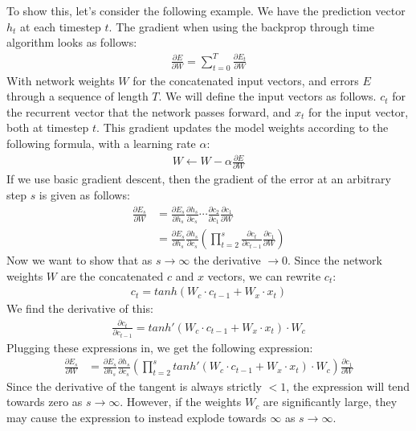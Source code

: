 To show this, let's consider the following example. We have the prediction vector $h_t$ at each timestep $t$. The gradient when using the backprop through time algorithm looks as follows:
\begin{align}
    \frac{\partial E}{\partial W} = \sum_{t=0}^{T} \frac{\partial E_t}{\partial W}
\end{align}
With network weights $W$ for the concatenated input vectors, and errors $E$ through a sequence of length $T$. We will define the input vectors as follows. $c_t$ for the recurrent vector that the network passes forward, and $x_t$ for the input vector, both at timestep $t$.
This gradient updates the model weights according to the following formula, with a learning rate $\alpha$:
\begin{align}
    W \leftarrow W - \alpha \frac{\partial E}{\partial W}
\end{align}
If we use basic gradient descent, then the gradient of the error at an arbitrary step $s$ is given as follows:
\begin{align}
    \frac{\partial E_s}{\partial W} &= \frac{\partial E_s}{\partial h_s}\frac{\partial h_s}{\partial c_s} \cdots \frac{\partial c_2}{\partial c_1} \frac{\partial c_1}{\partial W} \\
    &= \frac{\partial E_s}{\partial h_s}\frac{\partial h_s}{\partial c_s} \left(\prod_{t=2}^s\frac{\partial c_t}{\partial c_{t-1}} \frac{\partial c_1} {\partial W} \right)
\end{align}
Now we want to show that as $s \rightarrow \infty$ the derivative $\rightarrow 0$. Since the network weights $W$ are the concatenated $c$ and $x$ vectors, we can rewrite $c_t$:
\begin{align}
    c_t = tanh(W_c \cdot c_{t-1} + W_x \cdot x_t)
\end{align}
We find the derivative of this:
\begin{align}
    \frac{\partial c_t}{\partial c_{t-1}} = tanh'(W_c \cdot c_{t-1} + W_x \cdot x_t) \cdot W_c
\end{align}
Plugging these expressions in, we get the following expression:
\begin{align}
    \frac{\partial E_s}{\partial W} &= \frac{\partial E_s}{\partial h_s}\frac{\partial h_s}{\partial c_s} \left(\prod_{t=2}^s tanh'(W_c \cdot c_{t-1} + W_x \cdot x_t) \cdot W_c \right) \frac{\partial c_1}{\partial W}
\end{align}
Since the derivative of the tangent is always strictly $<1$, the expression will tend towards zero as $s \rightarrow \infty$. However, if the weights $W_c$ are significantly large, they may cause the expression to instead explode towards $\infty$ as $s \rightarrow \infty$.\\
